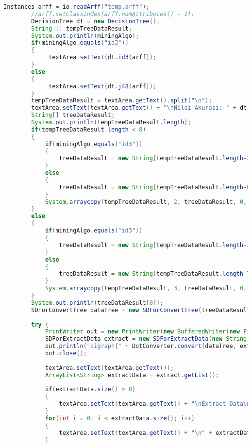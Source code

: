 \begin{lstlisting}[language=Java,basicstyle=\tiny,caption=Controller.java]
        Instances arff = io.readArff("temp.arff");
        //arff.setClassIndex(arff.numAttributes() - 1);
        DecisionTree dt = new DecisionTree();
        String [] tempTreeDataResult;
        System.out.println(miningAlgo);
        if(miningAlgo.equals("id3"))
        {
             textArea.setText(dt.id3(arff));
        }
        else
        {
             textArea.setText(dt.j48(arff));
        }
        tempTreeDataResult = textArea.getText().split("\n");
        textArea.setText(textArea.getText() + "\nNilai Akurasi: " + dt.calculatePrecision(arff) + "\n");
        String[] treeDataResult;
        System.out.println(tempTreeDataResult.length);
        if(tempTreeDataResult.length < 8)
        {
            if(miningAlgo.equals("id3"))
            {
                treeDataResult = new String[tempTreeDataResult.length-2];
            }
            else
            {
                treeDataResult = new String[tempTreeDataResult.length-6];
            }
            System.arraycopy(tempTreeDataResult, 2, treeDataResult, 0, treeDataResult.length);
        }
        else
        {
            if(miningAlgo.equals("id3"))
            {
                treeDataResult = new String[tempTreeDataResult.length-3];
            }
            else
            {
                treeDataResult = new String[tempTreeDataResult.length-7];
            }
            System.arraycopy(tempTreeDataResult, 3, treeDataResult, 0, treeDataResult.length);
        }
        System.out.println(treeDataResult[0]);
        SDForConvertTree dataTree = new SDForConvertTree(treeDataResult);
        
        try {
            PrintWriter out = new PrintWriter(new BufferedWriter(new FileWriter("tree.txt")));
            SDForExtractData extract = new SDForExtractData(new String[]{"bulan", "tahun", "hari", "jam"},new int[]{maxMin[0],maxMin[1],7,24}, new int[]{maxMin[2],maxMin[3],1,0});
            out.println("digraph{" + DotConverter.convert(dataTree, extract, miningAlgo, 0, "") + "}");
            out.close();
            
            textArea.setText(textArea.getText());
            ArrayList<String> extractData = extract.getList();
            
            if(extractData.size() > 0)
            {
                textArea.setText(textArea.getText() + "\nExtract Data\n");
            }
            for(int i = 0; i < extractData.size(); i++)
            {
                textArea.setText(textArea.getText() + "\n" + extractData.get(i));
            }
            

\end{lstlisting}
